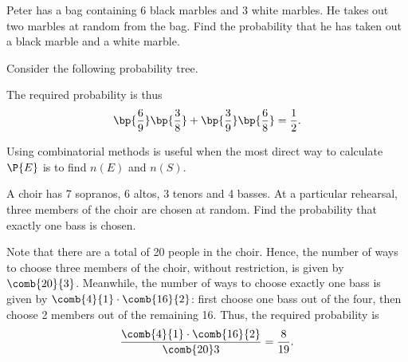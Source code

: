 \begin{sample}
    Peter has a bag containing 6 black marbles and 3 white marbles. He takes out two marbles at random from the bag. Find the probability that he has taken out a black marble and a white marble.
\end{sample}
\begin{sampans}
    Consider the following probability tree.
    \begin{figure}[H]
        \centering
        \caption{}
    \end{figure}
    The required probability is thus \[\bp{\frac69}\bp{\frac38} + \bp{\frac39}\bp{\frac68} = \frac12.\]
\end{sampans}

\begin{recipe}
    Using combinatorial methods is useful when the most direct way to calculate $\P{E}$ is to find $n(E)$ and $n(S)$.
\end{recipe}

\begin{sample}
    A choir has 7 sopranos, 6 altos, 3 tenors and 4 basses. At a particular rehearsal, three members of the choir are chosen at random. Find the probability that exactly one bass is chosen.
\end{sample}
\begin{sampans}
    Note that there are a total of 20 people in the choir. Hence, the number of ways to choose three members of the choir, without restriction, is given by $\comb{20}{3}$. Meanwhile, the number of ways to choose exactly one bass is given by $\comb{4}{1} \cdot \comb{16}{2}$: first choose one bass out of the four, then choose 2 members out of the remaining 16. Thus, the required probability is \[\frac{\comb{4}{1} \cdot \comb{16}{2}}{\comb{20}3} = \frac8{19}.\]
\end{sampans}
